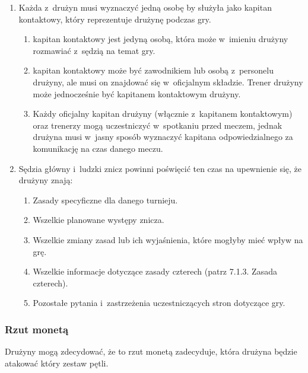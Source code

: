 \documentclass[12pt,a4paper]{article}
\begin{document}
\begin{enumerate}
	\item
	      Każda z~drużyn musi wyznaczyć jedną osobę by służyła jako kapitan
	      kontaktowy, który reprezentuje drużynę podczas gry.

	      \begin{enumerate}
		      \item
		            kapitan kontaktowy jest jedyną osobą, która może w~imieniu drużyny
		            rozmawiać z~sędzią na temat gry.
		      \item
		            kapitan kontaktowy może być zawodnikiem lub osobą z~personelu
		            drużyny, ale musi on znajdować się w~oficjalnym składzie. Trener
		            drużyny może jednocześnie być kapitanem kontaktowym drużyny.
		      \item
		            Każdy oficjalny kapitan drużyny (włącznie z~kapitanem kontaktowym)
		            oraz trenerzy mogą uczestniczyć w~spotkaniu przed meczem, jednak
		            drużyna musi w~jasny sposób wyznaczyć kapitana odpowiedzialnego za
		            komunikację na czas danego meczu.
	      \end{enumerate}
	\item
	      Sędzia główny i~ludzki znicz powinni poświęcić ten czas na upewnienie
	      się, że drużyny znają:

	      \begin{enumerate}
		      \item
		            Zasady specyficzne dla danego turnieju.
		      \item
		            Wszelkie planowane występy znicza.
		      \item
		            Wszelkie zmiany zasad lub ich wyjaśnienia, które mogłyby mieć wpływ
		            na grę.
		      \item
		            Wszelkie informacje dotyczące zasady czterech (patrz 7.1.3. Zasada
		            czterech).
		      \item
		            Pozostałe pytania i~zastrzeżenia uczestniczących stron dotyczące
		            gry.
	      \end{enumerate}
\end{enumerate}

\subsubsection{Rzut monetą}
Drużyny mogą zdecydować, że to rzut
monetą zadecyduje, która drużyna będzie atakować który zestaw pętli.
\end{document}
